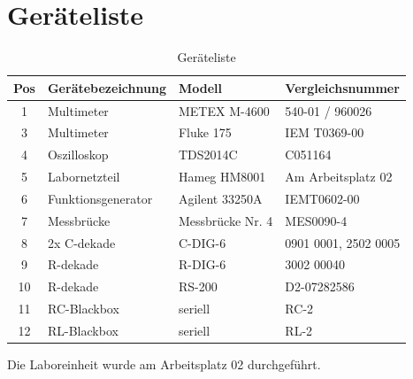 \section{Geräteliste}\label{sec:geraeteliste}

\begin{table}[h]
    \centering
    \caption{Geräteliste}\label{tab:geraeteliste}
    \begin{tabularx}{\columnwidth}{cXXX}
        Pos & \textbf{Gerätebezeichnung} & \textbf{Modell} & \textbf{Vergleichsnummer}\\ \midrule
        1 & Multimeter & METEX M-4600 & 540-01 / 960026\\
        3 & Multimeter & Fluke 175 & IEM T0369-00\\
        4 & Oszilloskop & TDS2014C & C051164\\
        5 & Labornetzteil & Hameg HM8001 & Am Arbeitsplatz 02 \\
        6 & Funktionsgenerator & Agilent 33250A & IEMT0602-00 \\
        7 & Messbrücke & Messbrücke Nr. 4 & MES0090-4 \\
        8 & 2x C-dekade & C-DIG-6 & 0901 0001, 2502 0005\\
        9 & R-dekade & R-DIG-6 & 3002 00040 \\ 
        10 & R-dekade & RS-200 & D2-07282586 \\
        11 & RC-Blackbox & seriell & RC-2 \\
        12 & RL-Blackbox & seriell & RL-2 \\
\end{tabularx} 
\end{table}

Die Laboreinheit wurde am Arbeitsplatz 02 durchgeführt.